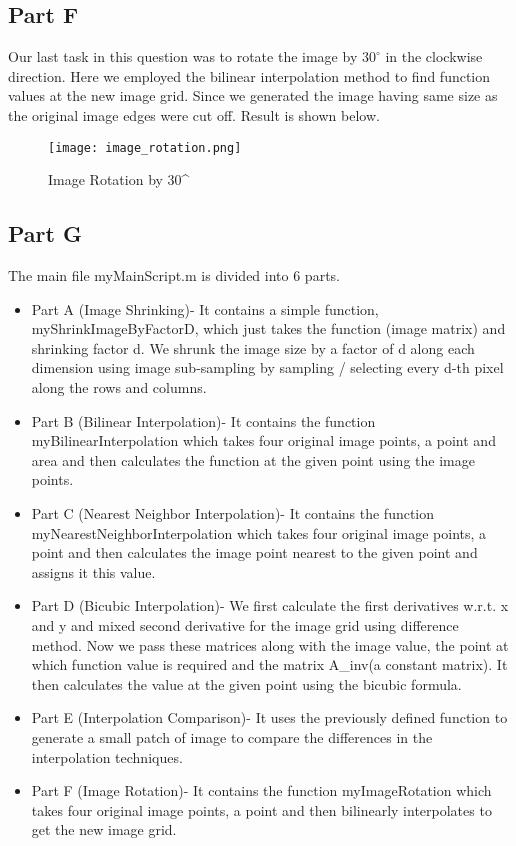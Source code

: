 \documentclass[12pt, a4paper]{article}
\begin{document}
\subsection*{Part F}
Our last task in this question was to rotate the image by $30^{\circ}$ in the clockwise direction. Here we employed the bilinear interpolation method to find function values at the new image grid. Since we generated the image having same size as the original image edges were cut off. Result is shown below.

\begin{figure}[h!]
  \centering
    \texttt{[image: image\_rotation.png]}
    \caption{Image Rotation by 30^{\circ}}
  \label{fig:7}
\end{figure}

\clearpage

\subsection*{Part G}
The main file myMainScript.m is divided into 6 parts. 
\begin{itemize}
    \item Part A (Image Shrinking)- It contains a simple function, myShrinkImageByFactorD, which just takes the function (image matrix) and shrinking factor d. We shrunk the image size by a factor of d along each dimension using image sub-sampling by sampling / selecting every d-th pixel along the rows and columns. 
    \item Part B (Bilinear Interpolation)- It contains the function myBilinearInterpolation which takes four original image points, a point and area and then calculates the function at the given point using the image points.
    \item Part C (Nearest Neighbor Interpolation)- It contains the function myNearestNeighborInterpolation which takes four original image points, a point and then calculates the image point nearest to the given point and assigns it this value. 
    \item Part D (Bicubic Interpolation)- We first calculate the first derivatives w.r.t. x and y and mixed second derivative for the image grid using difference method. Now we pass these matrices along with the image value, the point at which function value is required and the matrix A\_inv(a constant matrix). It then calculates the value at the given point using the bicubic formula.
    \item Part E (Interpolation Comparison)- It uses the previously defined function to generate a small patch of image to compare the differences in the interpolation techniques.
    \item Part F (Image Rotation)- It contains the function myImageRotation which takes four original image points, a point and then bilinearly interpolates to get the new image grid.
\end{itemize}
\end{document}
